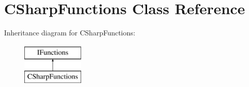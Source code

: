 \hypertarget{class_c_sharp_functions}{}\section{C\+Sharp\+Functions Class Reference}
\label{class_c_sharp_functions}
Inheritance diagram for C\+Sharp\+Functions\+:\begin{figure}[H]
\begin{center}
\leavevmode
\includegraphics[height=2.000000cm]{class_c_sharp_functions}
\end{center}
\end{figure}
